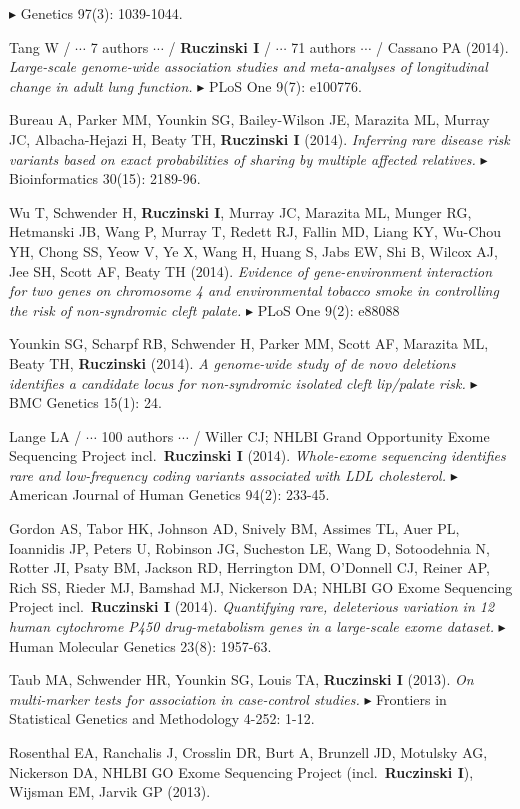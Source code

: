 \documentclass[10pt]{article}
\newcommand{\mine}{
  \addtocounter{enumi}{1}
\item[\fcolorbox{white}{grey}{\color{white} \tiny \arabic{enumi}}]
}
\newcommand{\dg}[1]{{\color{black} $\blacktriangleright$ {#1}}}
\begin{document}
\dg{Genetics 97(3): 1039-1044.}
\item 
Tang W / $\cdots$ 7 authors $\cdots$ / {\bf Ruczinski I} / $\cdots$ 71 authors $\cdots$ / Cassano PA (2014).
{\it Large-scale genome-wide association studies and meta-analyses of longitudinal change in adult lung function.}
\dg{PLoS One 9(7): e100776.}
\mine 
Bureau A, Parker MM, Younkin SG, Bailey-Wilson JE, Marazita ML, Murray JC, Albacha-Hejazi H, Beaty TH, {\bf Ruczinski I} (2014).  
{\it Inferring rare disease risk variants based on exact probabilities of sharing by multiple affected relatives.}
\dg{Bioinformatics 30(15): 2189-96.}
\item 
Wu T, Schwender H, {\bf Ruczinski I}, Murray JC, Marazita ML, Munger RG, Hetmanski JB, Wang P, Murray T, Redett RJ, Fallin MD, Liang KY, Wu-Chou YH, Chong SS, Yeow V, Ye X, Wang H, Huang S, Jabs EW, Shi B, Wilcox AJ, Jee SH, Scott AF, Beaty TH (2014).
{\it Evidence of gene-environment interaction for two genes on chromosome 4 and environmental tobacco smoke in controlling the risk of non-syndromic cleft palate.}
\dg{PLoS One 9(2): e88088}
\mine 
Younkin SG, Scharpf RB, Schwender H, Parker MM, Scott AF, Marazita ML, Beaty TH, {\bf Ruczinski} (2014). 
{\it A genome-wide study of de novo deletions identifies a candidate locus for non-syndromic isolated cleft lip/palate risk.}
\dg{BMC Genetics 15(1): 24.}
\item
Lange LA / $\cdots$ 100 authors $\cdots$ / Willer CJ; NHLBI Grand Opportunity Exome Sequencing Project incl.~{\bf Ruczinski I} (2014).
{\it Whole-exome sequencing identifies rare and low-frequency coding variants associated with LDL cholesterol.}
\dg{American Journal of Human Genetics 94(2): 233-45.} 
\item
Gordon AS, Tabor HK, Johnson AD, Snively BM, Assimes TL, Auer PL, Ioannidis JP, Peters U, Robinson JG, Sucheston LE, Wang D, Sotoodehnia N, Rotter JI, Psaty BM, Jackson RD, Herrington DM, O'Donnell CJ, Reiner AP, Rich SS, Rieder MJ, Bamshad MJ, Nickerson DA; NHLBI GO Exome Sequencing Project incl.~{\bf Ruczinski I} (2014).
{\it Quantifying rare, deleterious variation in 12 human cytochrome P450 drug-metabolism genes in a large-scale exome dataset.}
\dg{Human Molecular Genetics 23(8): 1957-63.}
\mine 
Taub MA, Schwender HR, Younkin SG, Louis TA, {\bf Ruczinski I} (2013).  
{\it On multi-marker tests for association in case-control studies.}
\dg{Frontiers in Statistical Genetics and Methodology 4-252: 1-12.}
\item
Rosenthal EA, Ranchalis J, Crosslin DR, Burt A, Brunzell JD, Motulsky AG, Nickerson DA, NHLBI GO Exome Sequencing Project (incl.~{\bf Ruczinski I}), Wijsman EM, Jarvik GP (2013).
\end{document}
